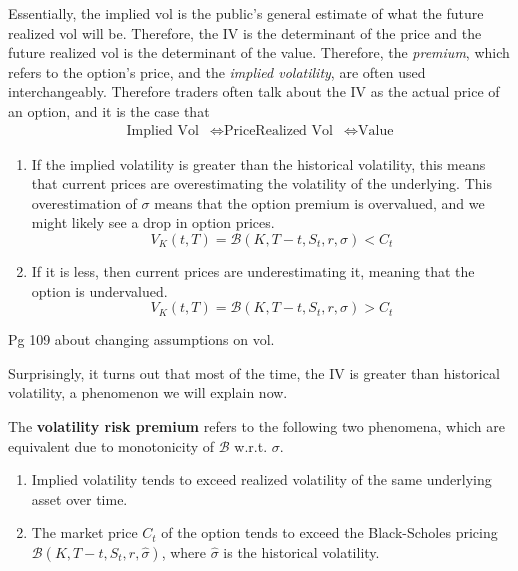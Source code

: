 \documentclass{article}
\begin{document}
    Essentially, the implied vol is the public's general estimate of what the future realized vol will be. Therefore, the IV is the determinant of the price and the future realized vol is the determinant of the value. Therefore, the \textit{premium}, which refers to the option's price, and the \textit{implied volatility}, are often used interchangeably. Therefore traders often talk about the IV as the actual price of an option, and it is the case that 
    \begin{align*}
      \text{Implied Vol} & \iff  \text{Price}
      \text{Realized Vol} & \iff \text{Value}
    \end{align*}

    \begin{enumerate}
      \item If the implied volatility is greater than the historical volatility, this means that current prices are overestimating the volatility of the underlying. This overestimation of $\sigma$ means that the option premium is overvalued, and we might likely see a drop in option prices. 
      \begin{equation}
        V_K (t, T) = \mathcal{B} (K, T - t, S_t, r, \sigma) < C_t
      \end{equation}

      \item If it is less, then current prices are underestimating it, meaning that the option is undervalued. 
      \begin{equation}
        V_K (t, T) = \mathcal{B} (K, T - t, S_t, r, \sigma) > C_t
      \end{equation}
    \end{enumerate}

    \begin{question}[Natenberg]
      Pg 109 about changing assumptions on vol. 
    \end{question}

    Surprisingly, it turns out that most of the time, the IV is greater than historical volatility, a phenomenon we will explain now. 

    \begin{definition}
      The \textbf{volatility risk premium} refers to the following two phenomena, which are equivalent due to monotonicity of $\mathcal{B}$ w.r.t. $\sigma$. 
      \begin{enumerate}
        \item Implied volatility tends to exceed realized volatility of the same underlying asset over time. 
        \item The market price $C_t$ of the option tends to exceed the Black-Scholes pricing $\mathcal{B}(K, T - t, S_t, r, \hat{\sigma})$, where $\hat{\sigma}$ is the historical volatility. 
      \end{enumerate}
    \end{definition}
\end{document}
